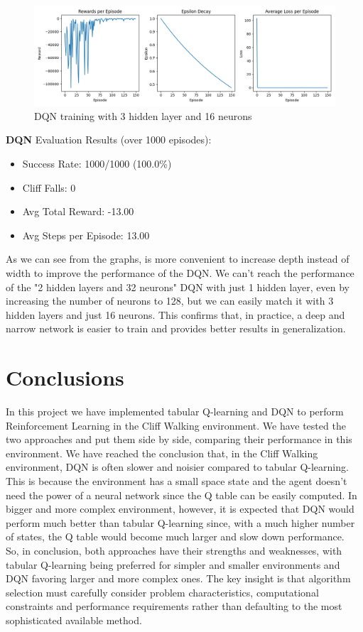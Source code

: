 \documentclass[a4paper,12pt]{article}
\begin{document}
\begin{figure}[H]
    \centering
    \includegraphics[width=\linewidth]{3_16.png}
    \caption{DQN training with 3 hidden layer and 16 neurons}
\end{figure}
\textbf{DQN} Evaluation Results (over 1000 episodes):
\begin{itemize}
    \item Success Rate: 1000/1000 (100.0\%)
    \item Cliff Falls: 0
    \item Avg Total Reward: -13.00
    \item Avg Steps per Episode: 13.00
\end{itemize}
\vspace{0,5cm}
As we can see from the graphs, is more convenient to increase depth instead of width to improve the performance of the DQN. We can't reach the performance of the "2 hidden layers and 32 neurons" DQN with just 1 hidden layer, even by increasing the number of neurons to 128, but we can easily match it with 3 hidden layers and just 16 neurons. This confirms that, in practice, a deep and narrow network is easier to train and provides
better results in generalization.

\section{Conclusions}
In this project we have implemented tabular Q-learning and DQN to perform Reinforcement Learning in the Cliff Walking environment. We have tested the two approaches and put them side by side, comparing their performance in this environment. We have reached the conclusion that, in the Cliff Walking environment, DQN is often slower and noisier compared to tabular Q-learning. This is because the environment has a small space state and the agent doesn't need the power of a neural network since the Q table can be easily computed. In bigger and more complex environment, however, it is expected that DQN would perform much better than tabular Q-learning since, with a much higher number of states, the Q table would become much larger and slow down performance.\\

\noindent So, in conclusion, both approaches have their strengths and weaknesses, with tabular Q-learning being preferred for simpler and smaller environments and DQN favoring larger and more complex ones. The key insight is that algorithm selection must carefully consider problem characteristics, computational constraints and performance requirements rather than defaulting to the most sophisticated available method.
\end{document}
